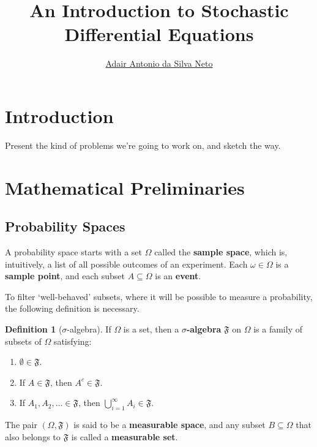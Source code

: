 \documentclass[12pt,a4paper]{article}
\author{\href{https://github.com/adairneto}{Adair Antonio da Silva Neto}}
\title{An Introduction to Stochastic Differential Equations}
\theoremstyle{definition}
\newtheorem{definition}{Definition}[section]
\begin{document}
\clearpage\maketitle
\thispagestyle{empty}

\newpage

\tableofcontents

\newpage
\clearpage
\setcounter{page}{1}

\section{Introduction}

Present the kind of problems we're going to work on, and sketch the way.

\newpage
\section{Mathematical Preliminaries}

\subsection{Probability Spaces}

A probability space starts with a set $\Omega$ called the \textbf{sample space}, which is, intuitively, a list of all possible outcomes of an experiment. Each $\omega \in \Omega$ is a \textbf{sample point}, and each subset $A \subseteq \Omega$ is an \textbf{event}.

To filter `well-behaved' subsets, where it will be possible to measure a probability, the following definition is necessary.

\begin{definition}[$\sigma$-algebra]
	If $\Omega$ is a set, then a \textbf{$\sigma$-algebra} $\mathfrak{F}$ on $\Omega$ is a family of subsets of $\Omega$ satisfying:
	\begin{enumerate}
		\item $\emptyset \in \mathfrak{F}$.
		\item If $A \in \mathfrak{F}$, then $A^c \in \mathfrak{F}$.
		\item If $A_1, A_2, \ldots \in \mathfrak{F}$, then $\bigcup_{i=1}^\infty A_i \in \mathfrak{F}$.
	\end{enumerate}
	The pair $(\Omega, \mathfrak{F})$ is said to be a \textbf{measurable space}, and any subset $B \subseteq \Omega$ that also belongs to $\mathfrak{F}$ is called a \textbf{measurable set}.
\end{definition}
\end{document}
